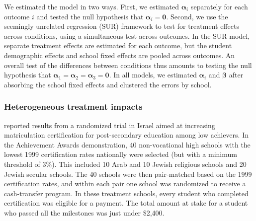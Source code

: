 \documentclass[12pt]{article}\usepackage[]{graphicx}\usepackage[]{color}
\newcommand{\bm}{\mathbf}
\newcommand{\bs}{\boldsymbol}
\begin{document}
We estimated the model in two ways. First, we estimated $\bs\alpha_i$ separately for each outcome $i$ and tested the null hypothesis that $\bs\alpha_i = \bm{0}$. Second, we use the seemingly unrelated regression (SUR) framework to test for treatment effects across conditions, using a simultaneous test across outcomes. In the SUR model, separate treatment effects are estimated for each outcome, but the student demographic effects and school fixed effects are pooled across outcomes. An overall test of the differences between conditions thus amounts to testing the null hypothesis that $\bs\alpha_1 = \bs\alpha_2 = \bs\alpha_3 = \bm{0}$. In all models, we estimated $\bs\alpha_i$ and $\bs\beta$ after absorbing the school fixed effects and clustered the errors by school.

\subsubsection{Heterogeneous treatment impacts} 

\citet{Angrist2009effects} reported results from a randomized trial in Israel aimed at increasing matriculation certification for post-secondary education among low achievers. 
In the Achievement Awards demonstration, 40 non-vocational high schools with the lowest 1999 certification rates nationally were selected (but with a  minimum threshold of 3\%). This included 10 Arab and 10 Jewish religious schools and 20 Jewish secular schools. The 40 schools were then pair-matched based on the 1999 certification rates, and within each pair one school was randomized to receive a cash-transfer program. In these treatment schools, every student who completed certification was eligible for a payment. The total amount at stake for a student who passed all the milestones was just under \$2,400.   
\end{document}
